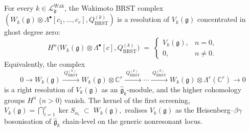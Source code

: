 \begin{theorem}
\label{thm:wakimoto-brst-full-nondegenerate}
For every $k\in\mathcal{L}^{\mathrm{Wak}}_{\mathfrak{g}}$, the
Wakimoto BRST complex
$(W_k(\mathfrak{g})\otimes\Lambda^\bullet[c_1,\ldots,c_r],
Q_{\mathrm{BRST}}^{(k)})$ is a resolution of $V_k(\mathfrak{g})$
concentrated in ghost degree zero:
\begin{equation}
\label{eq:wakimoto-brst-resolution-nondegenerate}
H^{n}\bigl(W_k(\mathfrak{g})\otimes\Lambda^\bullet[c],
Q_{\mathrm{BRST}}^{(k)}\bigr)
\;=\;
\begin{cases}
V_k(\mathfrak{g}), & n = 0,\\
0, & n\ne 0.
\end{cases}
\end{equation}
Equivalently, the complex
\begin{equation}
\label{eq:wakimoto-brst-complex-nondegenerate}
0 \to W_k(\mathfrak{g}) \xrightarrow{\;Q_{\mathrm{BRST}}^{(k)}\;}
W_k(\mathfrak{g})\otimes\mathbb{C}^r
\xrightarrow{\;Q_{\mathrm{BRST}}^{(k)}\;} \cdots
\xrightarrow{\;Q_{\mathrm{BRST}}^{(k)}\;}
W_k(\mathfrak{g})\otimes\Lambda^r(\mathbb{C}^r)\to 0
\end{equation}
is a right resolution of $V_k(\mathfrak{g})$ as an
$\widehat{\mathfrak{g}}_k$-module, and the higher cohomology groups
$H^n$ ($n>0$) vanish. The kernel of the first screening,
\(
V_k(\mathfrak{g})=\bigcap_{i=1}^{r}\ker S_{\alpha_i}
\;\subset\; W_k(\mathfrak{g}),
\)
realises $V_k(\mathfrak{g})$ as the Heisenberg--$\beta\gamma$
bosonisation of $\widehat{\mathfrak{g}}_k$ chain-level on the
generic nonresonant locus.
\end{theorem}


